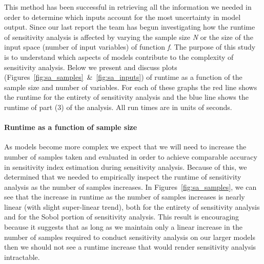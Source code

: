 \documentclass[article, 12pt, oneside]{memoir}
\begin{document}
This method has been successful in retrieving all the information we
needed in order to determine which inputs account for the most
uncertainty in model output. Since our last report the team has begun
investigating how the runtime of sensitivity analysis is affected by
varying the sample size \emph{N} or the size of the input space (number
of input variables) of function \emph{f}. The purpose of this study is
to understand which aspects of models contribute to the complexity of
sensitivity analysis. Below we present and discuss plots (Figures~\ref{fig:sa_samples}~\&~\ref{fig:sa_inputs}) of runtime as a
function of the sample size and number of variables. For each of these
graphs the red line shows the runtime for the entirety of sensitivity
analysis and the blue line shows the runtime of part (3) of the
analysis. All run times are in units of seconds.

\hypertarget{runtime-as-a-function-of-sample-size}{%
\paragraph{Runtime as a function of sample
size}\label{runtime-as-a-function-of-sample-size}}

As models become more complex we expect that we will need to increase
the number of samples taken and evaluated in order to achieve comparable
accuracy in sensitivity index estimation during sensitivity analysis.
Because of this, we determined that we needed to empirically inspect the
runtime of sensitivity analysis as the number of samples increases. 
In Figures~\ref{fig:sa_samples}, we can see that the increase in runtime as the number
of samples increases is nearly linear (with slight super-linear trend),
both for the entirety of sensitivity analysis and for the Sobol portion
of sensitivity analysis. This result is encouraging because it suggests
that as long as we maintain only a linear increase in the number of
samples required to conduct sensitivity analysis on our larger models
then we should not see a runtime increase that would render sensitivity
analysis intractable.

\end{document}
